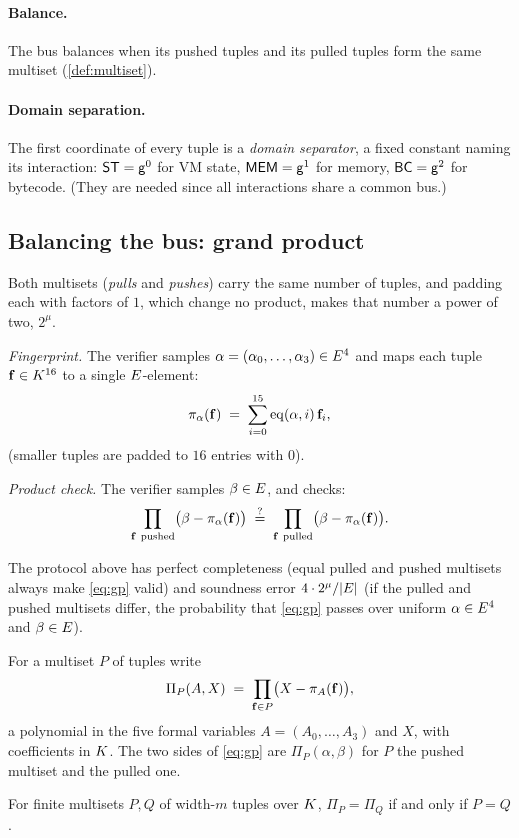 \paragraph{Balance.} The bus balances when its pushed tuples and its pulled tuples form the same multiset (\ref{def:multiset}).

\paragraph{Domain separation.} The first coordinate of every tuple is a \emph{domain separator}, a fixed constant naming its interaction: $\mathsf{ST}=\mathsf{g}^{0}$ for VM state, $\mathsf{MEM}=\mathsf{g}^{1}$ for memory, $\mathsf{BC}=\mathsf{g}^{2}$ for bytecode. (They are needed since all interactions share a common bus.)

\subsection{Balancing the bus: grand product}\label{sec:gp}

Both multisets (\emph{pulls} and \emph{pushes}) carry the same number of tuples, and padding each with factors of $1$, which change no product, makes that number a power of two, $2^{\mu}$.

\emph{Fingerprint.} The verifier samples $\alpha=(\alpha_0,\dots,\alpha_3)\in E^{4}$ and maps each tuple $\mathbf{f} \in K^{16}$ to a single $E$-element:
\[
\pi_\alpha(\mathbf{f})\;=\;\sum_{i=0}^{15}\operatorname{eq}(\alpha,i)\,\mathbf{f}_i ,
\]
(smaller tuples are padded to $16$ entries with $0$).

\emph{Product check.} The verifier samples $\beta\in E$, and checks:
\begin{equation}
\prod_{\btup\ \text{pushed}}\bigl(\beta-\pi_\alpha(\btup)\bigr)
\;\qeq\;
\prod_{\btup\ \text{pulled}}\bigl(\beta-\pi_\alpha(\btup)\bigr).
\label{eq:gp}
\end{equation}

\begin{theorem}\label{th:product_check}
  The protocol above has perfect completeness (equal pulled and pushed multisets always make \eqref{eq:gp} valid) and soundness error $4\cdot 2^{\mu}/|E|$ (if the pulled and pushed multisets differ, the probability that \eqref{eq:gp} passes over uniform $\alpha \in E^{4}$ and $\beta \in E$).
\end{theorem}

\begin{lemma}\label{lem:gp}
For a multiset $P$ of tuples write
\[
  \Pi_P(A,X)\;=\;\prod_{\mathbf{f}\in P}\bigl(X-\pi_A(\mathbf{f})\bigr),
\]
a polynomial in the five formal variables $A=(A_0,\dots,A_3)$ and $X$, with coefficients in $K$. The two sides of \eqref{eq:gp} are $\Pi_P(\alpha,\beta)$ for $P$ the pushed multiset and the pulled one.

For finite multisets $P,Q$ of width-$m$ tuples over $K$, $\Pi_P=\Pi_Q$ if and only if $P=Q$.
\end{lemma}

